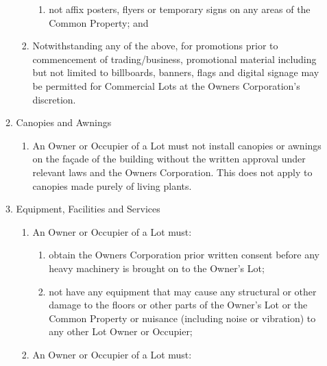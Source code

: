 \documentclass{article}
\begin{document}
\begin{enumerate}[label=\arabic*.]
\begin{enumerate}[label=\arabic{enumi}.\arabic*.]
\begin{enumerate}[label=(\arabic*)]
\begin{enumerate}[label=(\alph*)]
\item  not affix posters, flyers or temporary signs on any areas of the Common Property; and

\end{enumerate}

\item  Notwithstanding any of the above, for promotions prior to commencement of trading/business, promotional material including but not limited to billboards, banners, flags and digital signage may be permitted for Commercial Lots at the Owners Corporation's discretion.
\newpage


\end{enumerate}

\item  Canopies and Awnings

\begin{enumerate}[label=(\arabic*)]

\item  An Owner or Occupier of a Lot must not install canopies or awnings on the façade of the building without the written approval under relevant laws and the Owners Corporation. This does not apply to canopies made purely of living plants.

\end{enumerate}

\item  Equipment, Facilities and Services

\begin{enumerate}[label=(\arabic*)]

\item  An Owner or Occupier of a Lot must:

\begin{enumerate}[label=(\alph*)]

\item  obtain the Owners Corporation prior written consent before any heavy machinery is brought on to the Owner’s Lot;

\item  not have any equipment that may cause any structural or other damage to the floors or other parts of the Owner’s Lot or the Common Property or nuisance (including noise or vibration) to any other Lot Owner or Occupier;

\end{enumerate}

\item  An Owner or Occupier of a Lot must:

\begin{enumerate}[label=(\alph*)]


\end{enumerate}
\end{enumerate}
\end{enumerate}
\end{enumerate}
\end{document}

